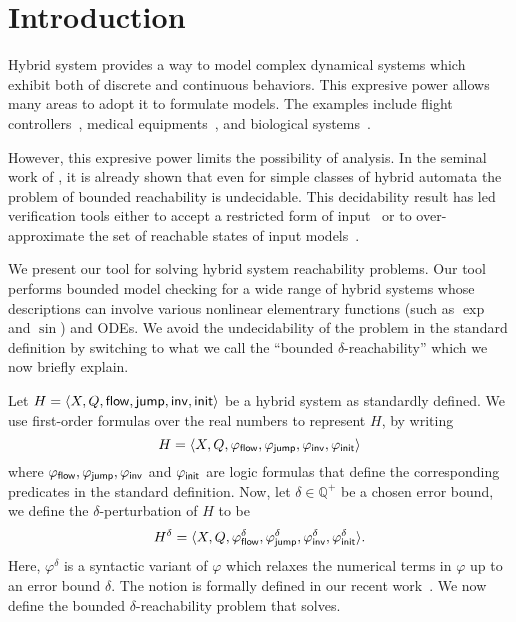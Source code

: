 \section{Introduction}


Hybrid system provides a way to model complex dynamical systems which
exhibit both of discrete and continuous behaviors. This expresive
power allows many areas to adopt it to formulate models. The examples
include flight controllers~\cite{?}, medical equipments~\cite{?}, and
biological systems~\cite{?}.

However, this expresive power limits the possibility of analysis. In
the seminal work of
\cite{DBLP:conf/rex/AlurD91,DBLP:conf/hybrid/AlurCHH92}, it is already
shown that even for simple classes of hybrid automata the problem of
bounded reachability is undecidable. This decidability result has led
verification tools either to accept a restricted form of
input~\cite{?} or to over-approximate the set of reachable states of
input models~\cite{?}.

We present our tool \dReach{} for solving hybrid system
reachability problems. Our tool performs bounded model checking for a
wide range of hybrid systems whose descriptions can involve various
nonlinear elementrary functions (such as $\exp$ and $\sin$) and
ODEs. We avoid the undecidability of the problem in the standard
definition by switching to what we call the ``bounded
$\delta$-reachability'' which we now briefly explain.

Let $H = \langle X, Q, \mathsf{flow}, \mathsf{jump}, \mathsf{inv}, \mathsf{init}\rangle$ be a hybrid
system as standardly defined. We use first-order formulas over the
real numbers to represent $H$, by writing $$H = \langle X, Q,
\varphi_{\mathsf{flow}}, \varphi_{\mathsf{jump}}, \varphi_{\mathsf{inv}},
\varphi_{\mathsf{init}}\rangle$$ where $\varphi_{\mathsf{flow}}, \varphi_{\mathsf{jump}},
\varphi_{\mathsf{inv}}$ and $\varphi_{\mathsf{init}}$ are logic formulas that define
the corresponding predicates in the standard definition. Now, let
$\delta\in \mathbb{Q}^+$ be a chosen error bound, we define the
$\delta$-perturbation of $H$ to be $$H^{\delta} = \langle X, Q,
\varphi_{\mathsf{flow}}^{\delta}, \varphi_{\mathsf{jump}}^{\delta},
\varphi_{\mathsf{inv}}^{\delta}, \varphi_{\mathsf{init}}^{\delta}\rangle.$$ Here,
$\varphi^{\delta}$ is a syntactic variant of $\varphi$ which relaxes
the numerical terms in $\varphi$ up to an error bound $\delta$. The
notion is formally defined in our recent
work~\cite{DBLP:conf/lics/GaoAC12,DBLP:conf/cade/GaoAC12,DBLP:journals/corr/GaoKCC14}.
We now define the bounded $\delta$-reachability problem that
\dReach{} solves.

